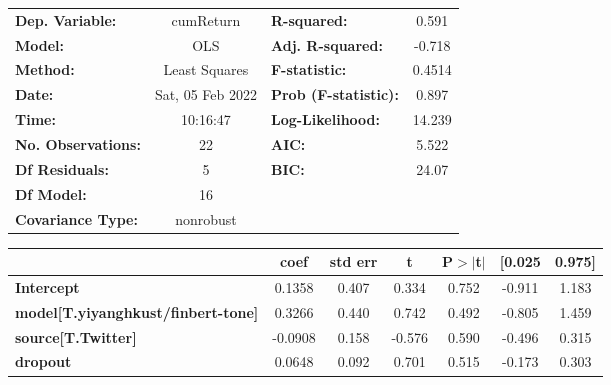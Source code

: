 \begin{center}
\begin{tabular}{lclc}
\toprule
\textbf{Dep. Variable:}                    &    cumReturn     & \textbf{  R-squared:         } &     0.591   \\
\textbf{Model:}                            &       OLS        & \textbf{  Adj. R-squared:    } &    -0.718   \\
\textbf{Method:}                           &  Least Squares   & \textbf{  F-statistic:       } &    0.4514   \\
\textbf{Date:}                             & Sat, 05 Feb 2022 & \textbf{  Prob (F-statistic):} &    0.897    \\
\textbf{Time:}                             &     10:16:47     & \textbf{  Log-Likelihood:    } &    14.239   \\
\textbf{No. Observations:}                 &          22      & \textbf{  AIC:               } &     5.522   \\
\textbf{Df Residuals:}                     &           5      & \textbf{  BIC:               } &     24.07   \\
\textbf{Df Model:}                         &          16      & \textbf{                     } &             \\
\textbf{Covariance Type:}                  &    nonrobust     & \textbf{                     } &             \\
\bottomrule
\end{tabular}
\begin{tabular}{lcccccc}
                                           & \textbf{coef} & \textbf{std err} & \textbf{t} & \textbf{P$> |$t$|$} & \textbf{[0.025} & \textbf{0.975]}  \\
\midrule
\textbf{Intercept}                         &       0.1358  &        0.407     &     0.334  &         0.752        &       -0.911    &        1.183     \\
\textbf{model[T.yiyanghkust/finbert-tone]} &       0.3266  &        0.440     &     0.742  &         0.492        &       -0.805    &        1.459     \\
\textbf{source[T.Twitter]}                 &      -0.0908  &        0.158     &    -0.576  &         0.590        &       -0.496    &        0.315     \\
\textbf{dropout}                           &       0.0648  &        0.092     &     0.701  &         0.515        &       -0.173    &        0.303     \\

\end{tabular}
\end{center}
